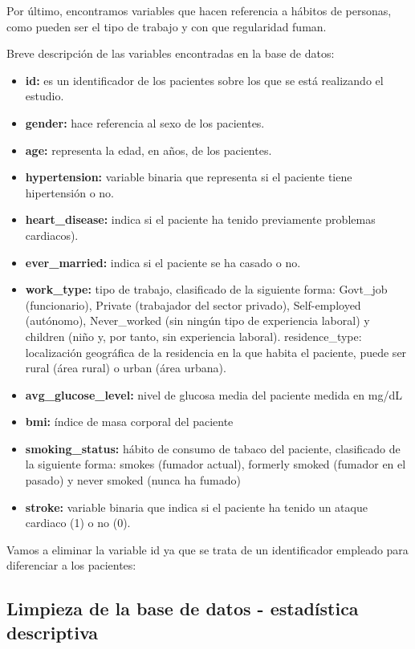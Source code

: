 \documentclass[
]{article}
\begin{document}
Por último, encontramos variables que hacen referencia a hábitos de
personas, como pueden ser el tipo de trabajo y con que regularidad
fuman.

Breve descripción de las variables encontradas en la base de datos:

\begin{itemize}
\item \textbf {id:} es un identificador de los pacientes sobre los que se está realizando el estudio.
\item \textbf {gender:} hace referencia al sexo de los pacientes.
\item \textbf {age:} representa la edad, en años, de los pacientes.
\item \textbf {hypertension:} variable binaria que representa si el paciente tiene hipertensión o no.
\item \textbf {heart_disease:} indica si el paciente ha tenido previamente problemas cardiacos).
\item \textbf {ever_married:} indica si el paciente se ha casado o no.
\item \textbf {work_type:} tipo de trabajo, clasificado de la siguiente forma: Govt_job (funcionario), Private (trabajador del sector privado), Self-employed (autónomo), Never_worked (sin ningún tipo de experiencia laboral) y children (niño y, por tanto, sin experiencia laboral).
residence_type: localización geográfica de la residencia en la que habita el paciente, puede ser rural (área rural) o urban (área urbana).
\item \textbf {avg_glucose_level:} nivel de glucosa media del paciente medida en mg/dL
\item \textbf {bmi:} índice de masa corporal del paciente
\item \textbf {smoking_status:} hábito de consumo de tabaco del paciente, clasificado de la siguiente forma: smokes (fumador actual), formerly smoked (fumador en el pasado) y never smoked (nunca ha fumado)
\item \textbf {stroke:} variable binaria que indica si el paciente ha tenido un ataque cardiaco (1) o no (0).
\end{itemize}

Vamos a eliminar la variable id ya que se trata de un identificador
empleado para diferenciar a los pacientes:

\hypertarget{limpieza-de-la-base-de-datos---estaduxedstica-descriptiva}{%
\subsection{Limpieza de la base de datos - estadística
descriptiva}\label{limpieza-de-la-base-de-datos---estaduxedstica-descriptiva}}
\end{document}
